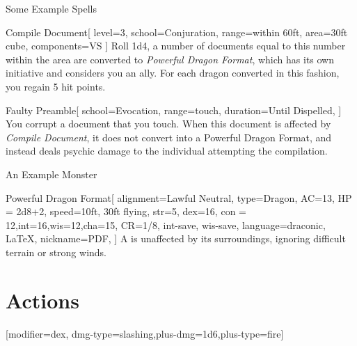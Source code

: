 \documentclass[theme=dnd,size=10pt,columns=2,justified]{rpgbook}
\begin{document}
			\begin{RpgTip}{Some Example Spells}
				\begin{RpgSpell}{Compile Document}[
						level=3,
						school=Conjuration,
						range=within 60ft,
						area=30ft cube,
						components={VS}
					]
					Roll 1d4, a number of documents equal to this number within the area are converted to \textit{Powerful Dragon Format}, which has its own initiative and considers you an ally. For each dragon converted in this fashion, you regain 5 hit points.

				\end{RpgSpell}

				\begin{RpgSpell}{Faulty Preamble}[
						school=Evocation,
						range=touch,
						duration={Until Dispelled},
					]
					You corrupt a document that you touch. When this document is affected by \textit{Compile Document}, it does not convert into a Powerful Dragon Format, and instead deals  psychic damage to the individual attempting the compilation.


				\end{RpgSpell}
			\end{RpgTip}

			\begin{RpgTip}{An Example Monster}

				\begin{RpgStat}{Powerful Dragon Format}[
						alignment=Lawful Neutral,
						type=Dragon,
						AC=13,
						HP =  2d8+2,
						speed={10ft, 30ft flying},
						str=5, dex=16, con = 12,int=16,wis=12,cha=15,
						CR=1/8,
						int-save, wis-save,
						language={draconic, \LaTeX},
						nickname=PDF,
					]
					 A \name{} is unaffected by its surroundings, ignoring difficult terrain or strong winds.


					\section{Actions}

						[modifier=dex, dmg-type=slashing,plus-dmg=1d6,plus-type=fire]
				\end{RpgStat}
			\end{RpgTip}
\end{document}
